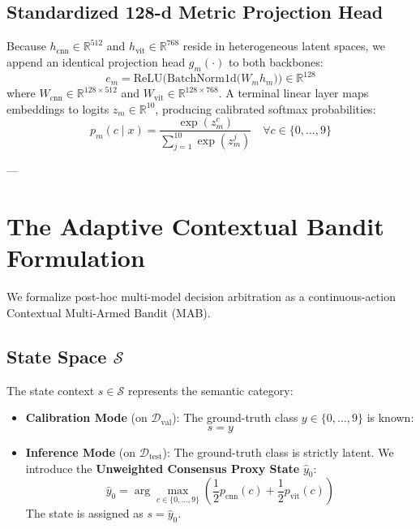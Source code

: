 \documentclass[10pt,journal,compsoc]{IEEEtran}
\begin{document}
\subsection{Standardized 128-d Metric Projection Head}
Because $h_{\text{cnn}} \in \mathbb{R}^{512}$ and $h_{\text{vit}} \in \mathbb{R}^{768}$ reside in heterogeneous latent spaces, we append an identical projection head $g_m(\cdot)$ to both backbones:
\begin{equation}
e_m = \text{ReLU}\Big(\text{BatchNorm1d}\big(W_m h_m\big)\Big) \in \mathbb{R}^{128}
\end{equation}
where $W_{\text{cnn}} \in \mathbb{R}^{128 \times 512}$ and $W_{\text{vit}} \in \mathbb{R}^{128 \times 768}$. A terminal linear layer maps embeddings to logits $z_m \in \mathbb{R}^{10}$, producing calibrated softmax probabilities:
\begin{equation}
p_m(c \mid x) = \frac{\exp(z_m^c)}{\sum_{j=1}^{10} \exp(z_m^j)} \quad \forall c \in \{0, \dots, 9\}
\end{equation}

---

\section{The Adaptive Contextual Bandit Formulation}

We formalize post-hoc multi-model decision arbitration as a continuous-action Contextual Multi-Armed Bandit (MAB).

\subsection{State Space $\mathcal{S}$}
The state context $s \in \mathcal{S}$ represents the semantic category:
\begin{itemize}
    \item \textbf{Calibration Mode} (on $\mathcal{D}_{\text{val}}$): The ground-truth class $y \in \{0, \dots, 9\}$ is known:
    \begin{equation}
    s = y
    \end{equation}
    \item \textbf{Inference Mode} (on $\mathcal{D}_{\text{test}}$): The ground-truth class is strictly latent. We introduce the \textbf{Unweighted Consensus Proxy State} $\hat{y}_0$:
    \begin{equation}
    \hat{y}_0 = \arg\max_{c \in \{0, \dots, 9\}} \left( \frac{1}{2} p_{\text{cnn}}(c) + \frac{1}{2} p_{\text{vit}}(c) \right)
    \end{equation}
    The state is assigned as $s = \hat{y}_0$.
\end{itemize}
\end{document}
